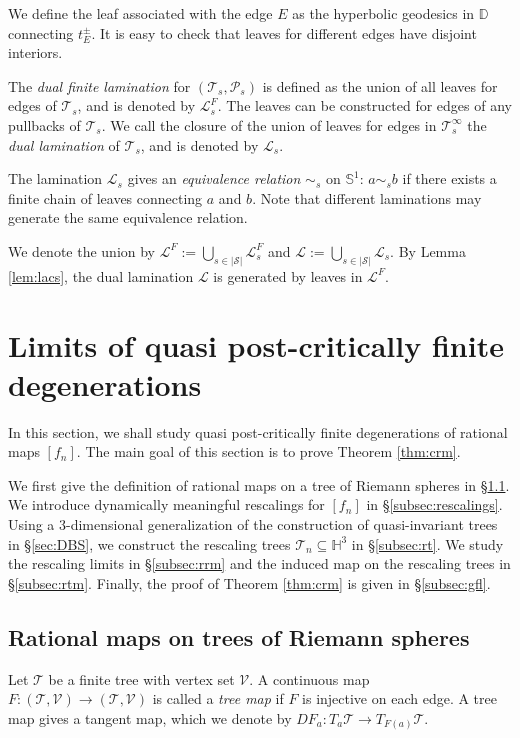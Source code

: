 \documentclass[11pt, reqno]{amsart}
\numberwithin{equation}{section}
\theoremstyle{plain}
\theoremstyle{theorem}
\theoremstyle{definition}
\newcommand{\Hyp}{\mathbb{H}}
\newcommand{\D}{\mathbb{D}}
\newcommand{\RT}{\mathscr{T}}
\newcommand{\RV}{\mathscr{V}}
\numberwithin{figure}{section}
\begin{document}
We define the leaf associated with the edge $E$ as the hyperbolic geodesics in $\D$ connecting $t^\pm_E$.
It is easy to check that leaves for different edges have disjoint interiors.

The {\em dual finite lamination} for $(\mathcal{T}_s,\mathcal{P}_s)$ is defined as the union of all leaves for edges of $\mathcal{T}_s$, and is denoted by $\mathcal{L}^F_s$.
The leaves can be constructed for edges of any pullbacks of $\mathcal{T}_s$.
We call the closure of the union of leaves for edges in $\mathcal{T}_s^\infty$ the {\em dual lamination} of $\mathcal{T}_s$, and is denoted by $\mathcal{L}_s$.


The lamination $\mathcal{L}_s$ gives an {\em equivalence relation} $\sim_s$ on $\mathbb{S}^1$: $a\sim_s b$ if there exists a finite chain of leaves connecting $a$ and $b$.
Note that different laminations may generate the same equivalence relation.

We denote the union by $\mathcal{L}^F:= \bigcup_{s\in |\mathcal{S}|} \mathcal{L}^F_s$ and $\mathcal{L}:= \bigcup_{s\in |\mathcal{S}|} \mathcal{L}_s$.
By Lemma \ref{lem:lacs}, the dual lamination $\mathcal{L}$ is generated by leaves in $\mathcal{L}^F$.

\section{Limits of quasi post-critically finite degenerations}\label{sec:qpcfd}
In this section, we shall study quasi post-critically finite degenerations of rational maps $[f_n]$.
The main goal of this section is to prove Theorem \ref{thm:crm}.

We first give the definition of rational maps on a tree of Riemann spheres in \S \ref{subsec:trs}.
We introduce dynamically meaningful rescalings for $[f_n]$ in \S \ref{subsec:rescalings}.
Using a 3-dimensional generalization of the construction of quasi-invariant trees in \S \ref{sec:DBS}, we construct the rescaling trees $\mathscr{T}_n \subseteq \Hyp^3$ in \S \ref{subsec:rt}.
We study the rescaling limits in \S \ref{subsec:rrm} and the induced map on the rescaling trees in \S \ref{subsec:rtm}.
Finally, the proof of Theorem \ref{thm:crm} is given in \S \ref{subsec:gfl}.


\subsection{Rational maps on trees of Riemann spheres}\label{subsec:trs}
Let $\RT$ be a finite tree with vertex set $\RV$.
A continuous map $F: (\RT, \RV) \longrightarrow (\RT, \RV)$ is called a {\em tree map} if $F$ is injective on each edge.
A tree map gives a tangent map, which we denote by $DF_a: T_a\RT \longrightarrow T_{F(a)}\RT$.
\end{document}
